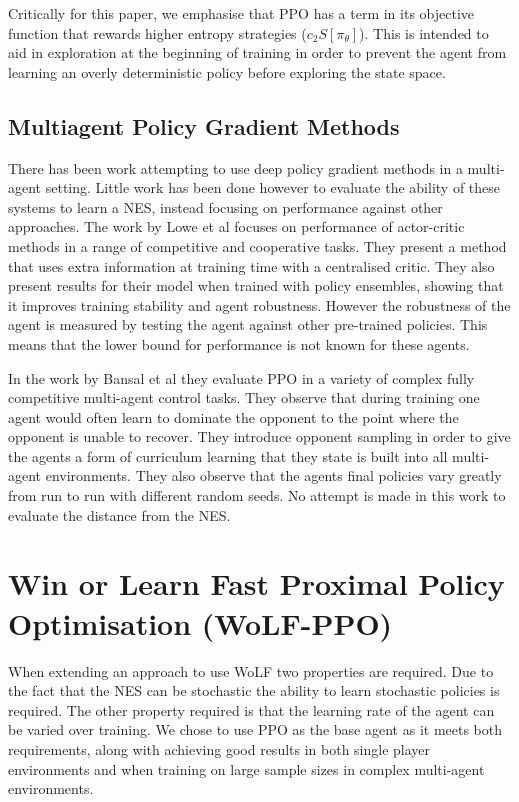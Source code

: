 \documentclass[conference]{IEEEtran}
\begin{document}
Critically for this paper, we emphasise that PPO has a term in its objective function that rewards higher entropy strategies ($c_2S[\pi_{\theta}]$). This is intended to aid in exploration at the beginning of training in order to prevent the agent from learning an overly deterministic policy before exploring the state space.

\subsection{Multiagent Policy Gradient Methods}

There has been work attempting to use deep policy gradient methods in a multi-agent setting. Little work has been done however to evaluate the ability of these systems to learn a NES, instead focusing on performance against other approaches. The work by Lowe et al\cite{lowe2017multi} focuses on performance of actor-critic methods in a range of competitive and cooperative tasks. They present a method that uses extra information at training time with a centralised critic. They also present results for their model when trained with policy ensembles, showing that it improves training stability and agent robustness. However the robustness of the agent is measured by testing the agent against other pre-trained policies. This means that the lower bound for performance is not known for these agents.

In the work by Bansal et al\cite{bansal2017emergent} they evaluate PPO in a variety of complex fully competitive multi-agent control tasks. They observe that during training one agent would often learn to dominate the opponent to the point where the opponent is unable to recover. They introduce opponent sampling in order to give the agents a form of curriculum learning that they state is built into all multi-agent environments. They also observe that the agents final policies vary greatly from run to run with different random seeds. No attempt is made in this work to evaluate the distance from the NES.

\section{Win or Learn Fast Proximal Policy Optimisation (WoLF-PPO)}

When extending an approach to use WoLF two properties are required. Due to the fact that the NES can be stochastic the ability to learn stochastic policies is required. The other property required is that the learning rate of the agent can be varied over training. We chose to use PPO as the base agent as it meets both requirements, along with achieving good results in both single player environments and when training on large sample sizes in complex multi-agent environments\cite{OpenAI_dota}.
\end{document}
